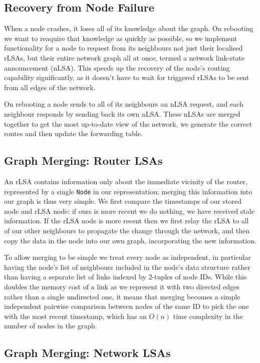\documentclass[withindex,glossary,openany]{cam-thesis}
\begin{document}
\subsection{Recovery from Node Failure}
\label{subsec:node_failure}

When a node crashes, it loses all of its knowledge about the graph. On rebooting we want to reaquire that knowledge as quickly as possible, so we implement functionality for a node to request from its neighbours not just their localised rLSAs, but their entire network graph all at once, termed a network link-state announcement (nLSA). This speeds up the recovery of the node's routing capability significantly, as it doesn't have to wait for triggered rLSAs to be sent from all edges of the network.

On rebooting a node sends to all of its neighbours an nLSA request, and each neighbour responds by sending back its own nLSA. These nLSAs are merged together to get the most up-to-date view of the network, we generate the correct routes and then update the forwarding table.

\subsection{Graph Merging: Router LSAs}

An rLSA contains information only about the immediate vicinity of the router, represented by a single \texttt{Node} in our representation; merging this information into our graph is thus very simple. We first compare the timestamps of our stored node and rLSA node: if ours is more recent we do nothing, we have received stale information. If the rLSA node is more recent then we first relay the rLSA to all of our other neighbours to propagate the change through the network, and then copy the data in the node into our own graph, incorporating the new information.

To allow merging to be simple we treat every node as independent, in particular having the node's list of neighbours included in the node's data structure rather than having a separate list of links indexed by 2-tuples of node IDs. While this doubles the memory cost of a link as we represent it with two directed edges rather than a single undirected one, it means that merging becomes a simple independent pairwise comparison between nodes of the same ID to pick the one with the most recent timestamp, which has an $O(n)$ time complexity in the number of nodes in the graph.

\subsection{Graph Merging: Network LSAs}
\end{document}
